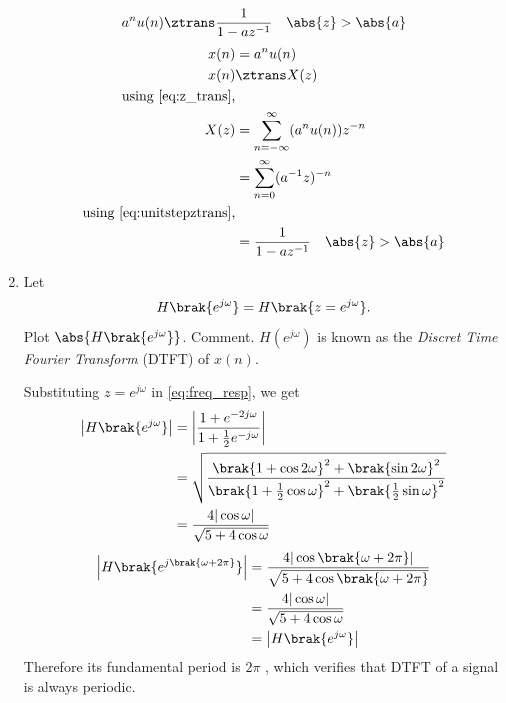 \documentclass[journal, 12pt, twocolumn]{IEEEtran}
\renewcommand\thesection{\arabic{section}}
\begin{document}
\begin{enumerate}[label=\thesection.\arabic*]
\begin{equation}
		      \label{eq:anun}
		      a^nu(n) \ztrans \frac{1}{1-az^{-1}} \quad \abs{z} > \abs{a}
	      \end{equation}
	      \solution
	      \begin{align}
		      x(n) & = a^n u(n)                                    \\
		      x(n) & \ztrans X(z)                                  \\
		      \notag\text{using \eqref{eq:z_trans},}               \\
		      X(z) & = \sum_{n=-\infty}^{\infty} (a^n u(n))z^{-n}  \\
		           & = \sum_{n=0}^{\infty} (a^{-1}z)^{-n}          \\
		      \notag\text{using \eqref{eq:unitstepztrans},}        \\
		           & = \frac{1}{1-az^{-1}} \quad \abs{z} > \abs{a}
	      \end{align}

	\item
	      Let
	      \begin{equation}
		      H\brak{e^{j \omega}} = H\brak{z = e^{j \omega}}.
	      \end{equation}
	      Plot $\abs{H\brak{e^{j \omega}}}$.  Comment.  $H(e^{j \omega})$ is
	      known as the {\em Discret Time Fourier Transform} (DTFT) of $x(n)$.
	      \\
	      \solution

	      Substituting $z = e^{j \omega}$ in \eqref{eq:freq_resp}, we get
	      \begin{align}
		      \left|H\brak{e^{j\omega}}\right| & = \left|\frac{1 + e^{-2j\omega}}{1 + \frac{1}{2}e^{-j\omega}}\right|                                                                         \\
		                                       & = \sqrt{\frac{\brak{1 + \cos{2\omega}}^2 + \brak{\sin{2\omega}}^2}{\brak{1 + \frac{1}{2}\cos{\omega}}^2 + \brak{\frac{1}{2}\sin{\omega}}^2}} \\
		                                       & = \frac{4|\cos{\omega}|}{\sqrt{5 + 4\cos{\omega}}}
	      \end{align}
	      \begin{align}
		      \left|H\brak{e^{j\brak{\omega + 2\pi}}}\right| & = \frac{4|\cos\brak{\omega + 2\pi}|}{\sqrt{5 + 4\cos\brak{\omega + 2\pi}}} \\
		                                                     & = \frac{4|\cos{\omega}|}{\sqrt{5 + 4\cos{\omega}}}                         \\
		                                                     & = \left|H\brak{e^{j\omega}}\right|
	      \end{align}
	      Therefore its fundamental period is $2\pi$ , which verifies that DTFT of a signal is always periodic.


\end{enumerate}
\end{document}
